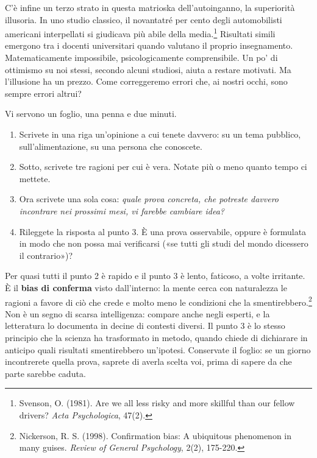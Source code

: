 C'è infine un terzo strato in questa matrioska dell'autoinganno, la superiorità illusoria. In uno studio classico, il novantatré per cento degli automobilisti americani interpellati si giudicava più abile della media.\footnote{Svenson, O. (1981). Are we all less risky and more skillful than our fellow drivers? \textit{Acta Psychologica}, 47(2).} Risultati simili emergono tra i docenti universitari quando valutano il proprio insegnamento. Matematicamente impossibile, psicologicamente comprensibile. Un po' di ottimismo su noi stessi, secondo alcuni studiosi, aiuta a restare motivati. Ma l'illusione ha un prezzo. Come correggeremo errori che, ai nostri occhi, sono sempre errori altrui?


\begin{provatu}
Vi servono un foglio, una penna e due minuti.

\begin{enumerate}[leftmargin=*,itemsep=2pt]
	\item Scrivete in una riga un'opinione a cui tenete davvero: su un tema pubblico, sull'alimentazione, su una persona che conoscete.
	\item Sotto, scrivete tre ragioni per cui è vera. Notate più o meno quanto tempo ci mettete.
	\item Ora scrivete una sola cosa: \textit{quale prova concreta, che potreste davvero incontrare nei prossimi mesi, vi farebbe cambiare idea?}
	\item Rileggete la risposta al punto 3. È una prova osservabile, oppure è formulata in modo che non possa mai verificarsi («se tutti gli studi del mondo dicessero il contrario»)?
\end{enumerate}

\spiegazione Per quasi tutti il punto 2 è rapido e il punto 3 è lento, faticoso, a volte irritante. È il \textbf{bias di conferma} visto dall'interno: la mente cerca con naturalezza le ragioni a favore di ciò che crede e molto meno le condizioni che la smentirebbero.\footnote{Nickerson, R. S. (1998). Confirmation bias: A ubiquitous phenomenon in many guises. \textit{Review of General Psychology}, 2(2), 175-220.} Non è un segno di scarsa intelligenza: compare anche negli esperti, e la letteratura lo documenta in decine di contesti diversi. Il punto 3 è lo stesso principio che la scienza ha trasformato in metodo, quando chiede di dichiarare in anticipo quali risultati smentirebbero un'ipotesi. Conservate il foglio: se un giorno incontrerete quella prova, saprete di averla scelta voi, prima di sapere da che parte sarebbe caduta.
\end{provatu}

